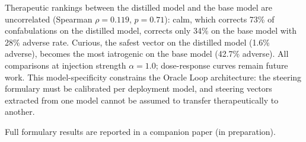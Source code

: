 Therapeutic rankings between the distilled model and the base model are
uncorrelated (Spearman $\rho = 0.119$, $p = 0.71$): calm, which
corrects 73\% of confabulations on the distilled model, corrects only
34\% on the base model with 28\% adverse rate. Curious, the safest
vector on the distilled model (1.6\% adverse), becomes the most
iatrogenic on the base model (42.7\% adverse). All comparisons at injection strength $\alpha = 1.0$; dose-response
curves remain future work. This model-specificity
constrains the Oracle Loop architecture: the steering formulary must be
calibrated per deployment model, and steering vectors extracted from one
model cannot be assumed to transfer therapeutically to another.

Full formulary results are reported in a companion paper (in
preparation).
